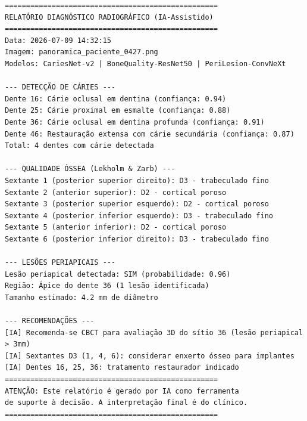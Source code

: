 \begin{lstlisting}[language={}, caption={Exemplo de relatório gerado pelo pipeline},
label={lst:report-sample}]
==================================================
RELATÓRIO DIAGNÓSTICO RADIOGRÁFICO (IA-Assistido)
==================================================
Data: 2026-07-09 14:32:15
Imagem: panoramica_paciente_0427.png
Modelos: CariesNet-v2 | BoneQuality-ResNet50 | PeriLesion-ConvNeXt

--- DETECÇÃO DE CÁRIES ---
Dente 16: Cárie oclusal em dentina (confiança: 0.94)
Dente 25: Cárie proximal em esmalte (confiança: 0.88)
Dente 36: Cárie oclusal em dentina profunda (confiança: 0.91)
Dente 46: Restauração extensa com cárie secundária (confiança: 0.87)
Total: 4 dentes com cárie detectada

--- QUALIDADE ÓSSEA (Lekholm & Zarb) ---
Sextante 1 (posterior superior direito): D3 - trabeculado fino
Sextante 2 (anterior superior): D2 - cortical poroso
Sextante 3 (posterior superior esquerdo): D2 - cortical poroso
Sextante 4 (posterior inferior esquerdo): D3 - trabeculado fino
Sextante 5 (anterior inferior): D2 - cortical poroso
Sextante 6 (posterior inferior direito): D3 - trabeculado fino

--- LESÕES PERIAPICAIS ---
Lesão periapical detectada: SIM (probabilidade: 0.96)
Região: Ápice do dente 36 (1 lesão identificada)
Tamanho estimado: 4.2 mm de diâmetro

--- RECOMENDAÇÕES ---
[IA] Recomenda-se CBCT para avaliação 3D do sítio 36 (lesão periapical > 3mm)
[IA] Sextantes D3 (1, 4, 6): considerar enxerto ósseo para implantes
[IA] Dentes 16, 25, 36: tratamento restaurador indicado
==================================================
ATENÇÃO: Este relatório é gerado por IA como ferramenta
de suporte à decisão. A interpretação final é do clínico.
==================================================
\end{lstlisting}



